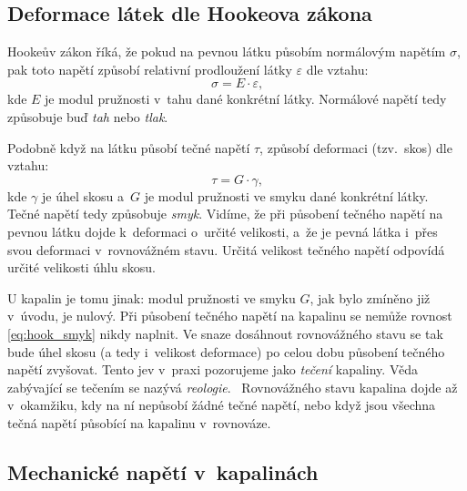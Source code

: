 \documentclass[12pt]{article}
\begin{document}
\subsection{Deformace látek dle Hookeova zákona}%
\label{sec:Hookeův_zákon}%

Hookeův zákon říká, že pokud na pevnou látku působím normálovým napětím $\sigma$, pak toto napětí způsobí relativní prodloužení látky $\varepsilon$ dle vztahu: 
\begin{equation}
    \sigma = E\cdot\varepsilon\text{,}
\end{equation}
kde $E$ je modul pružnosti v~tahu dané konkrétní látky. Normálové napětí tedy způsobuje buď \emph{tah} nebo \emph{tlak}.
\par \noindent
Podobně když na látku působí tečné napětí $\tau$, způsobí deformaci (tzv.~skos) dle vztahu: 
\begin{equation}
    \tau = G\cdot\gamma\text{,}
    \label{eq:hook_smyk}
\end{equation}
kde $\gamma$ je úhel skosu a~$G$ je modul pružnosti ve smyku dané konkrétní látky.~\cite{wiki:Pružnost} Tečné napětí tedy způsobuje \emph{smyk}.
Vidíme, že při působení tečného napětí na pevnou látku dojde k~deformaci o~určité velikosti, a~že je pevná látka i~přes svou deformaci v~rovnovážném stavu. Určitá velikost tečného napětí odpovídá určité velikosti úhlu skosu.
\par
U kapalin je tomu jinak: modul pružnosti ve smyku $G$, jak bylo zmíněno již v~úvodu, je nulový. Při působení tečného napětí na kapalinu se nemůže rovnost \ref{eq:hook_smyk} nikdy naplnit. Ve snaze dosáhnout rovnovážného stavu se tak bude úhel skosu (a tedy i~velikost deformace) po celou dobu působení tečného napětí zvyšovat. Tento jev v~praxi pozorujeme jako \emph{tečení} kapaliny. Věda zabývající se tečením se nazývá \emph{reologie}.~\cite{wiki:Rheology} Rovnovážného stavu kapalina dojde až v~okamžiku, kdy na ní nepůsobí žádné tečné napětí, nebo když jsou všechna tečná napětí působící na kapalinu v~rovnováze.

\subsection{Mechanické napětí v~kapalinách}%
\end{document}
